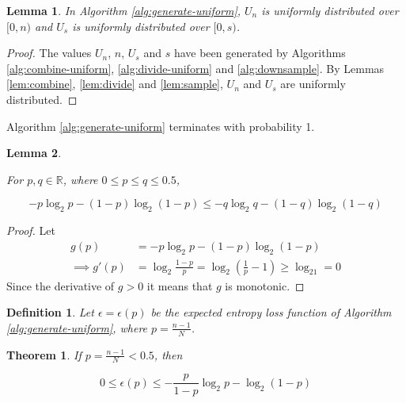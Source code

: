 \documentclass[12pt]{article}
\newtheorem{lemma}{Lemma}
\newtheorem{definition}{Definition}
\newtheorem{theorem}{Theorem}
\begin{document}
\begin{lemma}
    In Algorithm \ref{alg:generate-uniform}, 
$U_n$ is uniformly distributed over $[0,n)$ and 
$U_s$ is uniformly distributed over $[0,s)$.
\end{lemma}

\begin{proof}
The values $U_n$, $n$, $U_s$ and $s$ have been generated by Algorithms \ref{alg:combine-uniform}, \ref{alg:divide-uniform} and \ref{alg:downsample}. By Lemmas \ref{lem:combine}, \ref{lem:divide} and \ref{lem:sample}, $U_n$ and $U_s$ are uniformly distributed.
\end{proof}

Algorithm \ref{alg:generate-uniform} terminates with probability 1.

\begin{lemma}
    \label{lem:shannon-inequality}

For $p,q \in \mathbb{R}$, where $0 \le p\le q \le 0.5$, 

\begin{equation}
-p\log_2 p - (1-p)\log_2(1-p) \le -q\log_2 q - (1-q)\log_2(1-q)
\end{equation}
\end{lemma}

\begin{proof}
    Let
    \begin{align}
        g(p) & = -p\log_2 p - (1-p)\log_2(1-p) \\
        \implies g'(p) & = \log_2\frac{1-p}{p} = \log_2(\frac{1}{p}-1) \ge \log_21 = 0 
    \end{align}
Since the derivative of $g>0$ it means that $g$ is monotonic.
\end{proof}

\begin{definition}
    Let $\epsilon = \epsilon(p)$ be the expected entropy loss function of Algorithm \ref{alg:generate-uniform}, where $p=\frac{n-1}{N}$.
\end{definition}

\begin{theorem}
    \label{thm:loss}
If $p = \frac{n-1}{N} < 0.5$, then

\begin{equation}
0 \le \epsilon(p) \le -\frac{p}{1-p}\log_2p - \log_2(1-p)
\end{equation}

\end{theorem}
\end{document}
